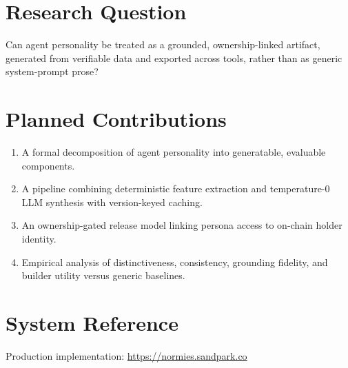 \documentclass[12pt,letterpaper]{article}
\begin{document}
\section*{Research Question}
Can agent personality be treated as a grounded, ownership-linked artifact, generated from verifiable data and exported across tools, rather than as generic system-prompt prose?

\section*{Planned Contributions}
\begin{enumerate}
  \item A formal decomposition of agent personality into generatable, evaluable components.
  \item A pipeline combining deterministic feature extraction and temperature-0 LLM synthesis with version-keyed caching.
  \item An ownership-gated release model linking persona access to on-chain holder identity.
  \item Empirical analysis of distinctiveness, consistency, grounding fidelity, and builder utility versus generic baselines.
\end{enumerate}

\section*{System Reference}
Production implementation: \url{https://normies.sandpark.co}
\end{document}
